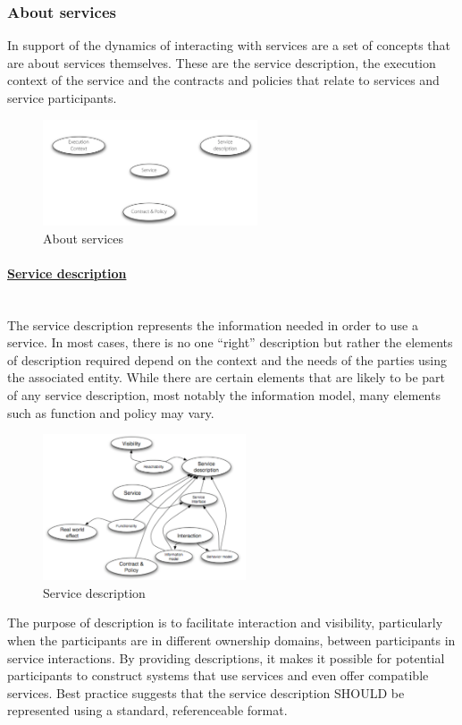 \documentclass[10pt,a4paper]{article}
\newcommand{\myparagraph}[1]{\paragraph{\uline{#1}}\mbox{}\\[0.05in]}
\begin{document}
\subsubsection{About services}
In support of the dynamics of interacting with services are a set of concepts that are about services themselves. These are the service description, the execution context of the service and the contracts and policies that relate to services and service participants.
\begin{figure}[h!]
 \hfill \includegraphics[width=180pt]{images/about-services}\hspace*{\fill}
  \caption{About services}
  \label{fig:about-services}
\end{figure}
\myparagraph{Service description}
The service description represents the information needed in order to use a service. In most cases, there is no one “right” description but rather the elements of description required depend on the context and the needs of the parties using the associated entity. While there are certain elements that are likely to be part of any service description, most notably the information model, many elements such as function and policy may vary.
\begin{figure}[h!]
 \hfill \includegraphics[width=170pt]{images/service-description}\hspace*{\fill}
  \caption{Service description}
  \label{fig:description}
\end{figure}
The purpose of description is to facilitate interaction and visibility, particularly when the participants are in different ownership domains, between participants in service interactions. By providing descriptions, it makes it possible for potential participants to construct systems that use services and even offer compatible services. Best practice suggests that the service description SHOULD be represented using a standard, referenceable format. \\ \\
\end{document}
